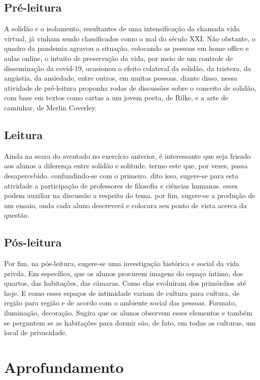 \documentclass[12pt]{extarticle}
\begin{document}
\subsection{Pré-leitura}

A solidão e o isolamento, resultantes de uma intensificação
da chamada vida virtual, já vinham sendo classificados como o mal do
século XXI. Não obstante, o quadro da pandemia agravou a situação,
colocando as pessoas em home office e aulas online, o intuito de
preservação da vida, por meio de um controle de disseminação da
covid-19, ocasionou o efeito colateral da solidão, da tristeza, da
angústia, da ansiedade, entre outros, em muitas pessoas. diante disso,
nessa atividade de pré-leitura proponha rodas de discussões sobre o
conceito de solidão, com base em textos como cartas a um jovem poeta, de
Rilke, e a arte de caminhar, de Merlin Coverley.

\subsection{Leitura}

Ainda na seara do aventado no exercício anterior, é
interessante que seja frisado aos alunos a diferença entre solidão e
solitude. termo este que, por vezes, passa desapercebido. confundindo-se
com o primeiro. dito isso, sugere-se para esta atividade a participação
de professores de filosofia e ciências humanas. esses podem auxiliar na
discussão a respeito do tema. por fim, sugere-se a produção de um
ensaio, onda cada aluno descreverá e colocara seu ponto de vista acerca
da questão.

\subsection{Pós-leitura}

Por fim, na pós-leitura, sugere-se uma investigação
histórica e social da vida privda. Em específico, que os alunos procurem
imagens do espaço íntimo, dos quartos, das habitações, das câmaras. Como
elas evoluíram dos primórdios até hoje. E como esses espaços de
intimidade variam de cultura para cultura, de região para região e de
acordo com o ambiente social das pessoas. Formato, iluminação,
decoração. Sugira que os alunos observem esses elementos e também se
perguntem se as habitações para dormir são, de fato, em todas as
culturas, um local de privacidade.

\section{Aprofundamento}
\end{document}
